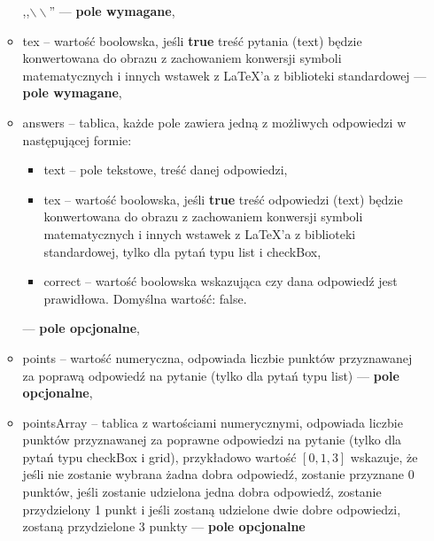 \begin{itemize}
\begin{itemize}
    ,,$\backslash\backslash$'' --- \textbf{pole wymagane},
    \item{tex} -- wartość boolowska, jeśli \textbf{true} treść pytania (text) będzie
    konwertowana do obrazu z zachowaniem konwersji symboli matematycznych i innych
    wstawek z \LaTeX{}'a z biblioteki standardowej --- \textbf{pole wymagane},
    \item{answers} -- tablica, każde pole zawiera jedną z możliwych odpowiedzi w
    następującej formie:
    \begin{itemize}
      \item text -- pole tekstowe, treść danej odpowiedzi,
      \item tex -- wartość boolowska, jeśli \textbf{true} treść odpowiedzi (text) będzie
      konwertowana do obrazu z zachowaniem konwersji symboli matematycznych i innych
      wstawek z \LaTeX{}'a z biblioteki standardowej, tylko dla pytań typu list i checkBox,
      \item correct -- wartość boolowska wskazująca czy dana odpowiedź jest prawidłowa.
      Domyślna wartość: false.
    \end{itemize} 
    --- \textbf{pole opcjonalne},
    \item{points} -- wartość numeryczna, odpowiada liczbie punktów przyznawanej za
    poprawą odpowiedź na pytanie (tylko dla pytań typu list)
    --- \textbf{pole opcjonalne},
    \item{pointsArray} -- tablica z wartościami numerycznymi, odpowiada liczbie punktów
    przyznawanej za poprawne odpowiedzi na pytanie (tylko dla pytań typu checkBox i grid),
    przykładowo wartość $ [0, 1, 3] $ wskazuje, że jeśli nie zostanie wybrana żadna dobra
    odpowiedź, zostanie przyznane 0 punktów, jeśli zostanie udzielona jedna dobra odpowiedź,
    zostanie przydzielony 1 punkt i jeśli zostaną udzielone dwie dobre odpowiedzi, zostaną
    przydzielone 3 punkty
    --- \textbf{pole opcjonalne}
  \end{itemize}
\end{itemize}

